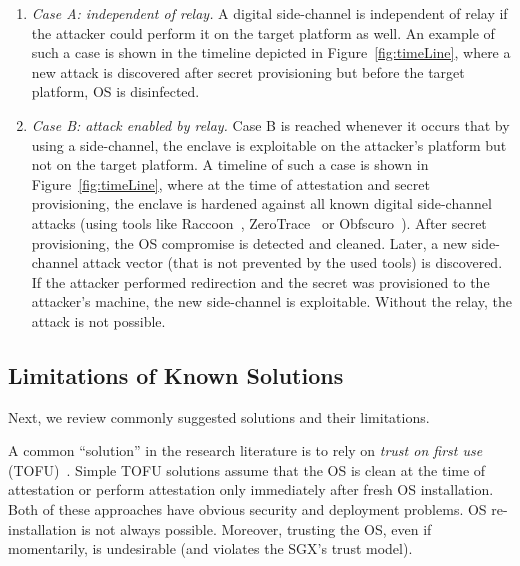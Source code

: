 \begin{enumerate}
    \item[]\emph{Case A: independent of relay.} A digital side-channel is independent of relay if the attacker could perform it on the target platform as well. An example of such a case is shown in the timeline depicted in Figure~\ref{fig:timeLine}, where a new attack is discovered after secret provisioning but before the target platform, OS is disinfected.
    

    \item[]\emph{Case B: attack enabled by relay.} Case B is reached whenever it occurs that by using a side-channel, the enclave is exploitable on the attacker's platform but not on the target platform. 
    A timeline of such a case is shown in Figure~\ref{fig:timeLine}, where at the time of attestation and secret provisioning, the enclave is hardened against all known digital side-channel attacks (using tools like Raccoon~\cite{raccoon}, ZeroTrace~\cite{zerotrace} or Obfscuro~\cite{obfscuro}). After secret provisioning, the OS compromise is detected and cleaned. Later, a new side-channel attack vector (that is not prevented by the used tools) is discovered. If the attacker performed redirection and the secret was provisioned to the attacker's machine, the new side-channel is exploitable. Without the relay, the attack is not possible.
    

\end{enumerate}


\subsection{Limitations of Known Solutions}
\label{sec:problemStatement:limitations}

Next, we review commonly suggested solutions and their limitations.

A common ``solution'' in the research literature is to rely on \emph{trust on first use} (TOFU)~\cite{tofu}. Simple TOFU solutions assume that the OS is clean at the time of attestation or perform attestation only immediately after fresh OS installation. Both of these approaches have obvious security and deployment problems. OS re-installation is not always possible. Moreover, trusting the OS, even if momentarily, is undesirable (and violates the SGX's trust model).

